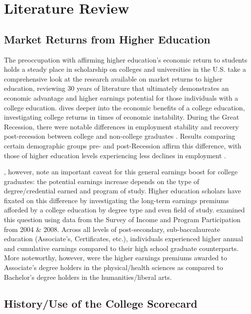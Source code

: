 \documentclass[a4paper, 12pt]{article}
\begin{document}
\section*{Literature Review}

\subsection*{Market Returns from Higher Education}

The preoccupation with affirming higher education's economic return to
students holds a steady place in scholarship on colleges and
universities in the U.S. \textcite{Oreopoulous_Petronijevic_2013} take
a comprehensive look at the research available on market returns to
higher education, reviewing 30 years of literature that ultimately
demonstrates an economic advantage and higher earnings potential for
those individuals with a college education. \textcite{hout_2012} dives
deeper into the economic benefits of a college education,
investigating college returns in times of economic instability. During
the Great Recession, there were notable differences in employment
stability and recovery post-recession between college and non-college
graduates \parencite{hout_2012, hout_etal_2011ch}. Results comparing
certain demographic groups pre- and post-Recession affirm this
difference, with those of higher education levels experiencing less
declines in employment \parencite{hoynesetal_2012}.


\textcite{Carnevale_etal_2011}, however, note an important caveat for
this general earnings boost for college graduates: the potential
earnings increase depends on the type of degree/credential earned and
program of study. Higher education scholars have fixated on this
difference by investigating the long-term earnings premiums afforded
by a college education by degree type and even field of
study. \textcite{kimtamborini_2019} examined this question using data
from the Survey of Income and Program Participation from 2004 \&
2008. Across all levels of post-secondary, sub-baccalaureate education
(Associate's, Certificates, etc.), individuals experienced higher
annual and cumulative earnings compared to their high school graduate
counterparts. More noteworthy, however, were the higher earnings
premiums awarded to Associate's degree holders in the physical/health
sciences as compared to Bachelor's degree holders in the
humanities/liberal arts.

\subsection*{History/Use of the College Scorecard}
\end{document}
